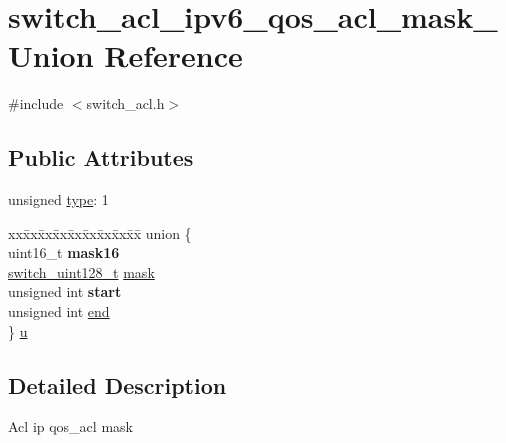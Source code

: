 \hypertarget{unionswitch__acl__ipv6__qos__acl__mask__}{\section{switch\+\_\+acl\+\_\+ipv6\+\_\+qos\+\_\+acl\+\_\+mask\+\_\+ Union Reference}
\label{unionswitch__acl__ipv6__qos__acl__mask__}
}


{\ttfamily \#include $<$switch\+\_\+acl.\+h$>$}

\subsection*{Public Attributes}
\begin{DoxyCompactItemize}
\item 
unsigned \hyperlink{unionswitch__acl__ipv6__qos__acl__mask___ada101bb9893742bd180456e149906a3c}{type}\+: 1
\item 
\begin{tabbing}
xx\=xx\=xx\=xx\=xx\=xx\=xx\=xx\=xx\=\kill
union \{\\
\>uint16\_t {\bfseries mask16}\\
\>\hyperlink{structswitch__uint128__t}{switch\_uint128\_t} \hyperlink{unionswitch__acl__ipv6__qos__acl__mask___a9515317a2471dc7abccf77b19ca1375c}{mask}\\
\>unsigned int {\bfseries start}\\
\>unsigned int \hyperlink{unionswitch__acl__ipv6__qos__acl__mask___a58d90227f22c4c325a4e42fb9c4f1e09}{end}\\
\} \hyperlink{unionswitch__acl__ipv6__qos__acl__mask___ad2f9b60a5cd2ebad830476deb9c6894c}{u}\\

\end{tabbing}\end{DoxyCompactItemize}


\subsection{Detailed Description}
Acl ip qos\+\_\+acl mask 

